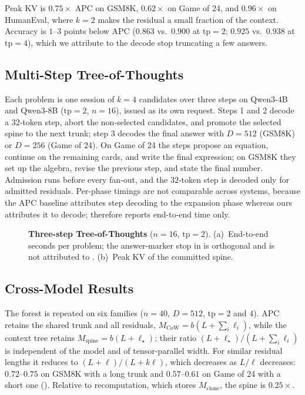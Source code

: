 Peak KV is $0.75\times$ APC on GSM8K, $0.62\times$ on Game of 24, and $0.96\times$ on HumanEval, where $k{=}2$ makes the residual a small fraction of the context.
Accuracy is $1$--$3$ points below APC ($0.863$ vs.\ $0.900$ at $\mathrm{tp}{=}2$; $0.925$ vs.\ $0.938$ at $\mathrm{tp}{=}4$), which we attribute to the decode stop truncating a few answers.

\subsection{Multi-Step Tree-of-Thoughts}
\label{sec:eval-mt}

Each problem is one session of $k{=}4$ candidates over three steps on Qwen3-4B and Qwen3-8B ($\mathrm{tp}{=}2$, $n{=}16$), issued as its own request.
Steps 1 and 2 decode a $32$-token step, abort the non-selected candidates, and promote the selected spine to the next trunk; step 3 decodes the final answer with $D{=}512$ (GSM8K) or $D{=}256$ (Game of 24).
On Game of 24 the steps propose an equation, continue on the remaining cards, and write the final expression; on GSM8K they set up the algebra, revise the previous step, and state the final number.
Admission runs before every fan-out, and the $32$-token step is decoded only for admitted residuals.
Per-phase timings are not comparable across systems, because the APC baseline attributes step decoding to the expansion phase whereas ours attributes it to decode;  therefore reports end-to-end time only.

\begin{figure}[t]
\centering
\resizebox{\columnwidth}{!}{}
\caption{\textbf{Three-step Tree-of-Thoughts} ($n{=}16$, $\mathrm{tp}{=}2$).
(a)~End-to-end seconds per problem; the answer-marker stop in \sys is orthogonal and is not attributed to \sys.
(b)~Peak KV of the committed spine.}
\label{fig:eval-mt}
\end{figure}

\subsection{Cross-Model Results}
\label{sec:eval-multi}

The forest is repeated on six families ($n{=}40$, $D{=}512$, $\mathrm{tp}{=}2$ and $4$).
APC retains the shared trunk and all residuals, $M_{\mathrm{CoW}}=b(L+\sum_i\ell_i)$, while the context tree retains $M_{\mathrm{spine}}=b(L+\ell_\star)$; their ratio $(L+\ell_\star)/(L+\sum_i\ell_i)$ is independent of the model and of tensor-parallel width.
For similar residual lengths it reduces to $(L+\ell)/(L+k\ell)$, which decreases as $L/\ell$ decreases: $0.72$--$0.75$ on GSM8K with a long trunk and $0.57$--$0.61$ on Game of 24 with a short one ().
Relative to recomputation, which stores $M_{\mathrm{clone}}$, the spine is $0.25\times$.

